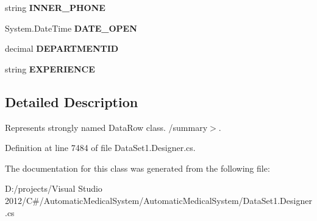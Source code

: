 \begin{CompactItemize}
\item 
string \textbf{INNER\_\-PHONE}\hspace{0.3cm}{\tt  [get, set]}\label{class_automatic_medical_system_1_1_data_set1_1_1_v_f_a_m_i_l_y_d_o_c_t_o_r_r_e_c_o_r_d_s_row_16db530f6bfdfaf9e7eb1a4439012e8e}

\item 
System.DateTime \textbf{DATE\_\-OPEN}\hspace{0.3cm}{\tt  [get, set]}\label{class_automatic_medical_system_1_1_data_set1_1_1_v_f_a_m_i_l_y_d_o_c_t_o_r_r_e_c_o_r_d_s_row_d4bf6f0df702380bf8d88b35fadf24be}

\item 
decimal \textbf{DEPARTMENTID}\hspace{0.3cm}{\tt  [get, set]}\label{class_automatic_medical_system_1_1_data_set1_1_1_v_f_a_m_i_l_y_d_o_c_t_o_r_r_e_c_o_r_d_s_row_42e786db0a840ab82c0d12eaac70d242}

\item 
string \textbf{EXPERIENCE}\hspace{0.3cm}{\tt  [get, set]}\label{class_automatic_medical_system_1_1_data_set1_1_1_v_f_a_m_i_l_y_d_o_c_t_o_r_r_e_c_o_r_d_s_row_caf107d03aa85b2fa635a6e83d322e73}

\end{CompactItemize}


\subsection{Detailed Description}
Represents strongly named DataRow class. /summary$>$. 

Definition at line 7484 of file DataSet1.Designer.cs.

The documentation for this class was generated from the following file:\begin{CompactItemize}
\item 
D:/projects/Visual Studio 2012/C\#/AutomaticMedicalSystem/AutomaticMedicalSystem/DataSet1.Designer.cs\end{CompactItemize}
